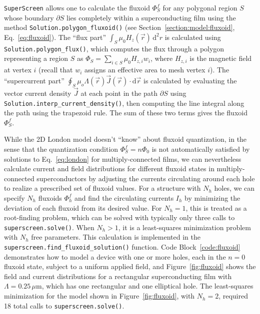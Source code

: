 \documentclass[final,3p,times,twocolumn]{elsarticle}
\newcommand{\inline}[1]{\texttt{#1}\xspace}
\newcommand{\SuperScreen}{\inline{SuperScreen}}
\newcommand{\um}{\mu\mathrm{m}}
\begin{document}
\SuperScreen allows one to calculate the fluxoid $\Phi^f_S$ for any polygonal region $S$ whose boundary $\partial S$ lies completely within a superconducting film using the method \inline{Solution.polygon_fluxoid()} (see Section~\ref{section:model:fluxoid}, Eq.~\ref{eq:fluxoid}). The ``flux part''  $\int_S\mu_0H_z(\vec{r})\,\mathrm{d}^2r$ is calculated using \inline{Solution.polygon_flux()}, which computes the flux through a polygon representing a region $S$ as $\Phi_S=\sum_{i\in S} \mu_0H_{z,i}w_i$, where $H_{z,i}$ is the magnetic field at vertex $i$ (recall that $w_i$ assigns an effective area to mesh vertex $i$). The ``supercurrent part'' $\oint_S\mu_o\Lambda(\vec{r})\vec{J}(\vec{r})\cdot\mathrm{d}\vec{r}$ is calculated by evaluating the vector current density $\vec{J}$ at each point in the path $\partial S$ using \inline{Solution.interp_current_density()}, then computing the line integral along the path using the trapezoid rule. The sum of these two terms gives the fluxoid $\Phi^f_S$.

While the 2D London model doesn't ``know'' about fluxoid quantization, in the sense that the quantization condition $\Phi^f_S=n\Phi_0$ is not automatically satisfied by solutions to Eq.~\ref{eq:london} for multiply-connected films, we can nevertheless calculate current and field distributions for different fluxoid states in multiply-connected superconductors by adjusting the currents circulating around each hole to realize a prescribed set of fluxoid values. For a structure with $N_h$ holes, we can specify $N_h$ fluxoids $\Phi^f_h$ and find the circulating currents $I_h$ by minimizing the deviation of each fluxoid from its desired value. For $N_h=1$, this is treated as a root-finding problem, which can be solved with typically only three calls to \inline{superscreen.solve()}. When $N_h>1$, it is a least-squares minimization problem with $N_h$ free parameters. This calculation is implemented in the \inline{superscreen.find_fluxoid_solution()} function. Code Block~\ref{code:fluxoid} demonstrates how to model a device with one or more holes, each in the $n=0$ fluxoid state, subject to a uniform applied field, and Figure~\ref{fig:fluxoid} shows the field and current distributions for a rectangular superconducting film with $\Lambda=0.25\,\um$, which has one rectangular and one elliptical hole. The least-squares minimization for the model shown in Figure~\ref{fig:fluxoid}, with $N_h=2$, required 18 total calls to \inline{superscreen.solve()}.
\end{document}
